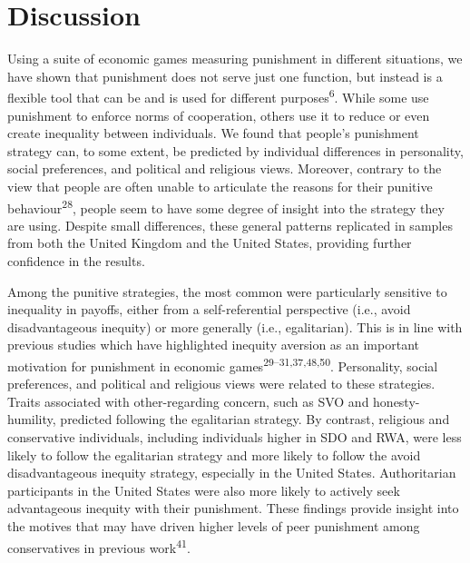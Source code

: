 \documentclass[
  man,floatsintext]{apa6}
\begin{document}
\hypertarget{discussion}{%
\section{Discussion}\label{discussion}}

Using a suite of economic games measuring punishment in different situations,
we have shown that punishment does not serve just one function, but instead is
a flexible tool that can be and is used for different purposes\textsuperscript{6}.
While some use punishment to enforce norms of cooperation, others use it to
reduce or even create inequality between individuals. We found that people's
punishment strategy can, to some extent, be predicted by individual differences
in personality, social preferences, and political and religious views. Moreover,
contrary to the view that people are often unable to articulate the reasons for
their punitive behaviour\textsuperscript{28}, people seem to have some degree of
insight into the strategy they are using. Despite small differences, these
general patterns replicated in samples from both the United Kingdom and the
United States, providing further confidence in the results.

Among the punitive strategies, the most common were particularly sensitive to
inequality in payoffs, either from a self-referential perspective (i.e., avoid
disadvantageous inequity) or more generally (i.e., egalitarian). This is in
line with previous studies which have highlighted inequity aversion as an
important motivation for punishment in economic games\textsuperscript{29--31,37,48,50}.
Personality, social preferences, and political and religious views were related
to these strategies. Traits associated with other-regarding concern, such as SVO
and honesty-humility, predicted following the egalitarian strategy. By contrast,
religious and conservative individuals, including individuals higher in SDO and
RWA, were less likely to follow the egalitarian strategy and more likely to
follow the avoid disadvantageous inequity strategy, especially in the United
States. Authoritarian participants in the United States were also more likely to
actively seek advantageous inequity with their punishment. These findings
provide insight into the motives that may have driven higher levels of peer
punishment among conservatives in previous work\textsuperscript{41}.
\end{document}
